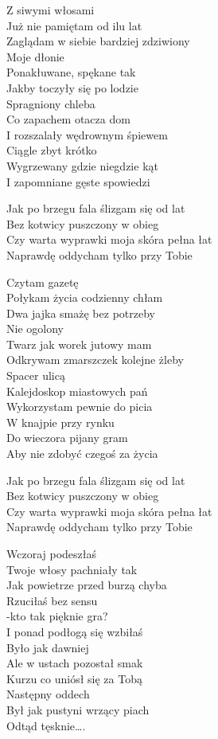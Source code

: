 \begin{text}
    \begin{footTwelve}
Z siwymi włosami\\
Już nie pamiętam od ilu lat\\
Zaglądam w siebie bardziej zdziwiony\\
Moje dłonie\\
Ponakłuwane, spękane tak\\
Jakby toczyły się po lodzie\\
Spragniony chleba\\
Co zapachem otacza dom\\
I rozszalały wędrownym śpiewem\\
Ciągle zbyt krótko\\
Wygrzewany gdzie niegdzie kąt\\
I zapomniane gęste spowiedzi

Jak po brzegu fala ślizgam się od lat\\
Bez kotwicy puszczony w obieg\\
Czy warta wyprawki moja skóra pełna łat\\
Naprawdę oddycham tylko przy Tobie

Czytam gazetę\\
Połykam życia codzienny chłam\\
Dwa jajka smażę bez potrzeby\\
Nie ogolony\\
Twarz jak worek jutowy mam\\
Odkrywam zmarszczek kolejne żleby\\
Spacer ulicą\\
Kalejdoskop miastowych pań\\
Wykorzystam pewnie do picia\\
W knajpie przy rynku\\
Do wieczora pijany gram\\
Aby nie zdobyć czegoś za życia

Jak po brzegu fala ślizgam się od lat\\
Bez kotwicy puszczony w obieg\\
Czy warta wyprawki moja skóra pełna łat\\
Naprawdę oddycham tylko przy Tobie

Wczoraj podeszłaś\\
Twoje włosy pachniały tak\\
Jak powietrze przed burzą chyba\\
Rzuciłaś bez sensu\\
-kto tak pięknie gra?\\
I ponad podłogą się wzbiłaś\\
Było jak dawniej\\
Ale w ustach pozostał smak\\
Kurzu co uniósł się za Tobą\\
Następny oddech\\
Był jak pustyni wrzący piach\\
Odtąd tęsknie….


\end{footTwelve}
\end{text}
